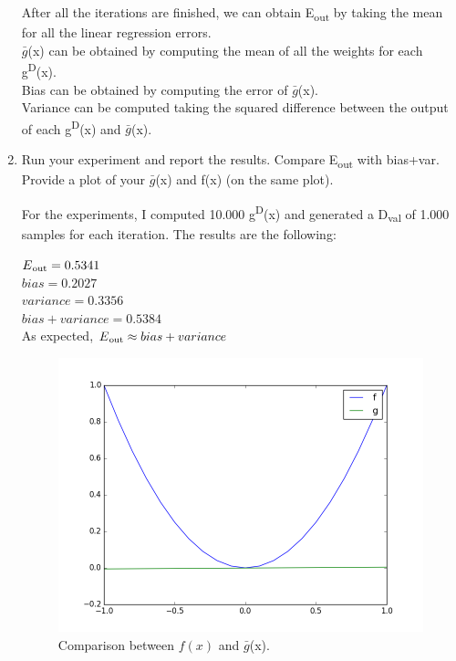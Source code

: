 \documentclass{article}
\begin{document}
\begin{enumerate}[label=(\alph*)]
After all the iterations are finished, we can obtain E\textsubscript{out} by taking the mean for all the linear regression errors.\\
$\bar{g}$(x) can be obtained by computing the mean of all the weights for each g\textsuperscript{D}(x).\\
Bias can be obtained by computing the error of $\bar{g}$(x).\\
Variance can be computed taking the squared difference between the output of each g\textsuperscript{D}(x) and $\bar{g}$(x).

\item Run your experiment and report the results. Compare E\textsubscript{out} with bias+var.
Provide a plot of your $\bar{g}$(x) and f(x) (on the same plot).

For the experiments, I computed 10.000 g\textsuperscript{D}(x) and generated a D\textsubscript{val} of 1.000 samples for each iteration. The results are the following:

$E\textsubscript{out} = 0.5341$\\
$bias = 0.2027$\\
$variance = 0.3356$\\
$bias + variance = 0.5384$\\

As expected, $E\textsubscript{out}\approx bias+variance$

\begin{figure}[H]
    \centering
	\includegraphics[scale=0.35]{images/3.png} 
    \caption{Comparison between $f(x)$ and $\bar{g}$(x).}
\end{figure}


\end{enumerate}
\end{document}
